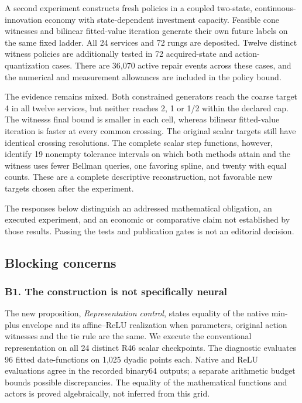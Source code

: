 \documentclass[ecta,nameyear,draft]{econsocart}
\begin{document}
A second experiment constructs fresh policies in a coupled two-state,
continuous-innovation economy with state-dependent investment capacity.
Feasible cone witnesses and bilinear fitted-value iteration generate
their own future labels on the same fixed ladder. All 24 services and 72
rungs are deposited. Twelve distinct witness policies are additionally
tested in 72 acquired-state and action-quantization cases. There are
36,070 active repair events across these cases, and the numerical and
measurement allowances are included in the policy bound.

The evidence remains mixed. Both constrained generators reach the coarse
target 4 in all twelve services, but neither reaches 2, 1 or 1/2 within
the declared cap. The witness\textquotesingle s final bound is smaller
in each cell, whereas bilinear fitted-value iteration is faster at every
common crossing. The original scalar targets still have identical
crossing resolutions. The complete scalar step functions, however,
identify 19 nonempty tolerance intervals on which both methods attain
and the witness uses fewer Bellman queries, one favoring spline, and
twenty with equal counts. These are a complete descriptive
reconstruction, not favorable new targets chosen after the experiment.

The responses below distinguish an addressed mathematical obligation, an
executed experiment, and an economic or comparative claim not
established by those results. Passing the tests and publication gates is
not an editorial decision.

\hypertarget{blocking-concerns}{%
\subsection{Blocking concerns}\label{blocking-concerns}}

\hypertarget{b1-the-construction-is-not-specifically-neural}{%
\subsubsection{B1. The construction is not specifically
neural}\label{b1-the-construction-is-not-specifically-neural}}

The new proposition, \emph{Representation control}, states equality of
the native min-plus envelope and its affine--ReLU realization when
parameters, original action witnesses and the tie rule are the same. We
execute the conventional representation on all 24 distinct R46 scalar
checkpoints. The diagnostic evaluates 96 fitted date-functions on 1,025
dyadic points each. Native and ReLU evaluations agree in the recorded
binary64 outputs; a separate arithmetic budget bounds possible
discrepancies. The equality of the mathematical functions and actors is
proved algebraically, not inferred from this grid.
\end{document}
